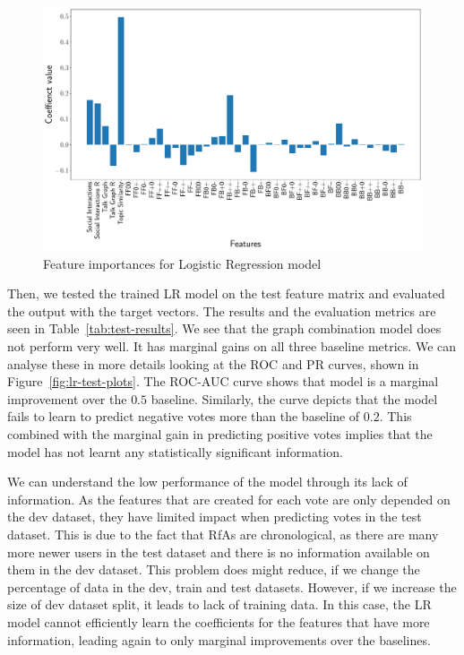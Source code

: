 \begin{figure}[htp]
    \centering
    \includegraphics[width=\textwidth]{images/Logistic Regression_features.pdf}
    \caption{Feature importances for Logistic Regression model }
    \label{fig:lr-feature-importances}
\end{figure}


Then, we tested the trained LR model on the test feature matrix and evaluated the output with the target vectors.
The results and the evaluation metrics are seen in Table~\ref{tab:test-results}.
We see that the graph combination model does not perform very well.
It has marginal gains on all three baseline metrics.
We can analyse these in more details looking at the ROC and PR curves, shown in Figure~\ref{fig:lr-test-plots}.
The ROC-AUC curve shows that model is a marginal improvement over the $0.5$ baseline.
Similarly, the \negPR curve depicts that the model fails to learn to predict negative votes more than the baseline of $0.2$. 
This combined with the marginal gain in predicting positive votes implies that the model has not learnt any statistically significant information.

We can understand the low performance of the model through its lack of information.
As the features that are created for each vote are only depended on the dev dataset, they have limited impact when predicting votes in the test dataset.
This is due to the fact that RfAs are chronological, as there are many more newer users in the test dataset and there is no information available on them in the dev dataset.
This problem does might reduce, if we change the percentage of data in the dev, train and test datasets.
However, if we increase the size of dev dataset split, it leads to lack of training data.
In this case, the LR model cannot efficiently learn the coefficients for the features that have more information, leading again to only marginal improvements over the baselines.

